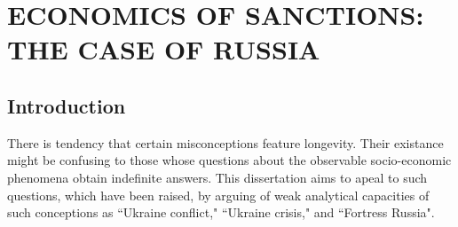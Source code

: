 \newpage

\section{\MakeUppercase{Economics of Sanctions: The Case of Russia}}


\subsection{Introduction}

There is tendency that certain misconceptions feature longevity. Their existance might be confusing to those whose questions about the observable socio-economic phenomena obtain indefinite answers. This dissertation aims to apeal to such questions, which have been raised,  by arguing of weak analytical capacities of such conceptions as ``Ukraine conflict," ``Ukraine crisis," and ``Fortress Russia".

